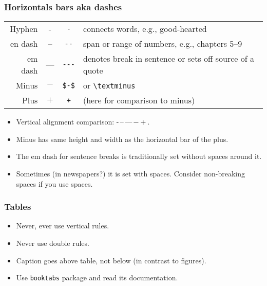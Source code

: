 \documentclass[aspectratio=1610]{beamer}
\begin{document}
\begin{frame}[fragile]
    \frametitle{Horizontals bars aka dashes}
    \begin{tabular}{rccl}
        Hyphen & - & \verb+-+ & connects words, e.g., good-hearted \\ %
        en dash & -- & \verb+--+ & span or range of numbers, e.g., chapters 5--9 \\ %
        em dash & --- & \verb+---+ & denotes break in sentence or sets off source of a quote \\
        Minus & $-$ & \verb+$-$+ & or \verb+\textminus+ \\
        Plus & $+$ & \verb$+$ & (here for comparison to minus)  \\
    \end{tabular}
    \begin{itemize}
        \item Vertical alignment comparison: {\Huge -\,--\,---\,$-+$}. %
        \item Minus has same height and width as the horizontal bar of the plus.
        \item The em dash for sentence breaks is traditionally set without spaces around it.
        \item Sometimes (in newspapers?) it is set with spaces. Consider non-breaking spaces if you use spaces.
    \end{itemize}
\end{frame}

\begin{frame}[fragile]
    \frametitle{Tables}
    \begin{itemize}
        \item Never, ever use vertical rules.
        \item Never use double rules.
        \item Caption goes above table, not below (in contrast to figures).
        \item Use \verb+booktabs+ package and read its documentation.
    \end{itemize}
\end{frame}
\end{document}
